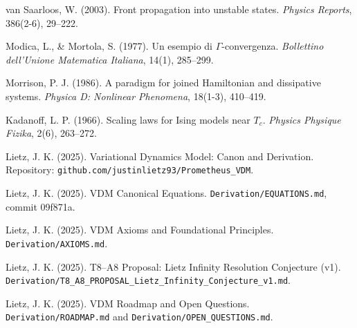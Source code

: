 \documentclass{article}
\begin{document}

\begin{thebibliography}{9}

van Saarloos, W. (2003).
\newblock Front propagation into unstable states.
\newblock \emph{Physics Reports}, 386(2-6), 29--222.
\newblock {}

Modica, L., \& Mortola, S. (1977).
\newblock Un esempio di $\Gamma$-convergenza.
\newblock \emph{Bollettino dell'Unione Matematica Italiana}, 14(1), 285--299.

Morrison, P. J. (1986).
\newblock A paradigm for joined Hamiltonian and dissipative systems.
\newblock \emph{Physica D: Nonlinear Phenomena}, 18(1-3), 410--419.
\newblock {}

Kadanoff, L. P. (1966).
\newblock Scaling laws for Ising models near $T_c$.
\newblock \emph{Physics Physique Fizika}, 2(6), 263--272.
\newblock {}

Lietz, J. K. (2025).
\newblock Variational Dynamics Model: Canon and Derivation.
\newblock Repository: \texttt{github.com/justinlietz93/Prometheus\_VDM}.

Lietz, J. K. (2025).
\newblock VDM Canonical Equations.
\newblock \texttt{Derivation/EQUATIONS.md}, commit 09f871a.

Lietz, J. K. (2025).
\newblock VDM Axioms and Foundational Principles.
\newblock \texttt{Derivation/AXIOMS.md}.

Lietz, J. K. (2025).
\newblock T8--A8 Proposal: Lietz Infinity Resolution Conjecture (v1).
\newblock \texttt{Derivation/T8\_A8\_PROPOSAL\_Lietz\_Infinity\_Conjecture\_v1.md}.

Lietz, J. K. (2025).
\newblock VDM Roadmap and Open Questions.
\newblock \texttt{Derivation/ROADMAP.md} and \texttt{Derivation/OPEN\_QUESTIONS.md}.

\end{thebibliography}
\end{document}
